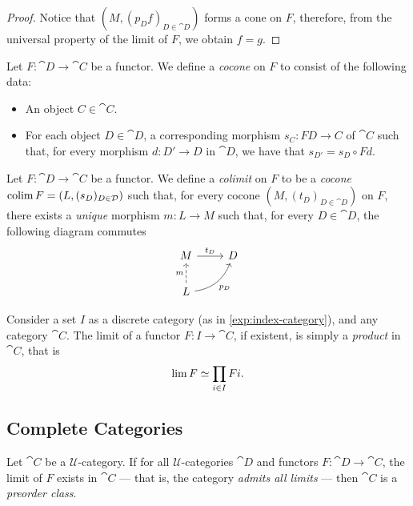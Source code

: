 \begin{proof}
Notice that \((M, (p_D f)_{D \in \cat D})\) forms a cone on \(F\), therefore,
from the universal property of the limit of \(F\), we obtain \(f = g\).
\end{proof}

\begin{definition}[Cocone]
\label{def:cocone}
Let \(F: \cat D \to \cat C\) be a functor. We define a \emph{cocone} on \(F\) to
consist of the following data:
\begin{itemize}\setlength\itemsep{0em}
\item An object \(C \in \cat C\).

\item For each object \(D \in \cat D\), a corresponding morphism \(s_C: F D \to
  C\) of \(\cat C\) such that, for every morphism \(d: D' \to D\) in \(\cat D\),
  we have that \(s_{D'} = s_D \circ F d\).
\end{itemize}
\end{definition}

\begin{definition}[Colimit]
\label{def:colimit}
Let \(F: \cat D \to \cat C\) be a functor. We define a \emph{colimit} on \(F\)
to be a \emph{cocone} \(\operatorname{colim} F = (L, (s_D)_{D \in \mathcal D})\) such that, for
every cocone \((M, (t_D)_{D \in \cat D})\) on \(F\), there exists a
\emph{unique} morphism \(m: L \to M\) such that, for every \(D \in \cat D\), the
following diagram commutes
\[
\begin{tikzcd}
M \ar[r, "t_D"] &D \\
L \ar[u, dashed, "m"] \ar[ru, bend right, "p_D"'] &
\end{tikzcd}
\]
\end{definition}

\begin{example}[Products]
\label{exp:product-is-limit-over-indexing-set-diagram}
Consider a set \(I\) as a discrete category (as in \cref{exp:index-category}),
and any category \(\cat C\). The limit of a functor \(F: I \to \cat C\), if
existent, is simply a \emph{product} in \(\cat C\), that is
\[
\operatorname{lim} F \simeq \prod_{i \in I} F i.
\]
\end{example}

\subsection{Complete Categories}

\begin{proposition}
\label{prop:all-limits-is-preorder}
Let \(\cat C\) be a \(\mathcal{U}\)-category. If for all
\(\mathcal{U}\)-categories \(\cat D\) and functors \(F: \cat D \to \cat C\), the
limit of \(F\) exists in \(\cat C\) --- that is, the category \emph{admits all
  limits} --- then \(\cat C\) is a \emph{preorder class}.
\end{proposition}


